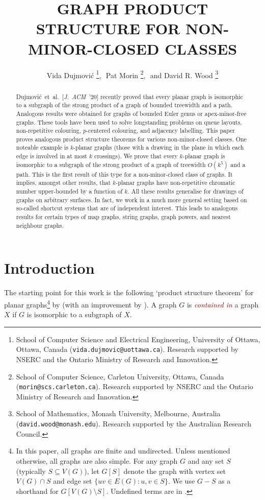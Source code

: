 \documentclass{patmorin}
\title{\MakeUppercase{Graph Product Structure for Non-Minor-Closed Classes}}
\author{%
Vida Dujmovi\'c%
\thanks{School of Computer Science and Electrical Engineering, University of Ottawa, Ottawa, Canada (\texttt{vida.dujmovic@uottawa.ca}). Research supported by NSERC and the Ontario Ministry of Research and Innovation.},\,\,
Pat Morin%
\thanks{School of Computer Science, Carleton University, Ottawa, Canada (\texttt{morin@scs.carleton.ca}). Research  supported by NSERC and the Ontario Ministry of Research and Innovation.},\,\, and
David R. Wood%
\thanks{School of Mathematics, Monash University, Melbourne, Australia (\texttt{david.wood@monash.edu}). Research supported by the Australian Research Council.}
}
\theoremstyle{plain}
\theoremstyle{definition}
\newcommand{\defin}[1]{\textcolor{Maroon}{\emph{#1}}}
\newcommand{\note}[2]{\noindent{\color{red}[#1:~#2]}}
\begin{document}
\begin{titlepage}
\maketitle

\begin{abstract}
Dujmovi\'c~et~al.~[\emph{J.~ACM}~'20] recently proved that every planar graph is isomorphic to a subgraph of the strong product of a graph of bounded treewidth and a path. Analogous results were obtained for graphs of bounded Euler genus or apex-minor-free graphs. These tools have been used to solve longstanding problems on queue layouts, non-repetitive colouring, $p$-centered colouring, and adjacency labelling. This paper proves analogous product structure theorems for various non-minor-closed classes. One noteable example is $k$-planar graphs (those with a drawing in the plane in which each edge is involved in at most $k$ crossings). We prove that every $k$-planar graph is isomorphic to a subgraph of the strong product of a graph of treewidth $O(k^5)$ and a path. This is the first result of this type for a non-minor-closed class of graphs. It implies, amongst other results, that $k$-planar graphs have non-repetitive chromatic number upper-bounded by a function of $k$. All these results generalise for drawings of graphs on arbitrary surfaces. In fact, we work in a much more general setting based on so-called shortcut systems that are of independent interest. This leads to analogous results for certain types of map graphs, string graphs, graph powers, and nearest neighbour graphs.
\end{abstract}
\end{titlepage}
\tableofcontents
\newpage

\section{Introduction}
\label{Introduction}


The starting point for this work is the following `product structure theorem' for planar graphs\footnote{In this paper, all graphs are finite and undirected. Unless mentioned otherwise, all graphs are also simple. For any graph $G$ and any set $S$ (typically $S\subseteq V(G)$), let $G[S]$  denote the graph with vertex set $V(G)\cap S$ and edge set $\{uv\in E(G) : u,v\in S\}$.  We use $G-S$ as a shorthand for $G[V(G)\setminus S]$. Undefined terms are in \citep{Diestel5}.} by \citet{DJMMUW20} (with an improvement by \citet{UWY}). A graph $G$ is \defin{contained in} a graph $X$ if $G$ is isomorphic to a subgraph of $X$.
\end{document}
